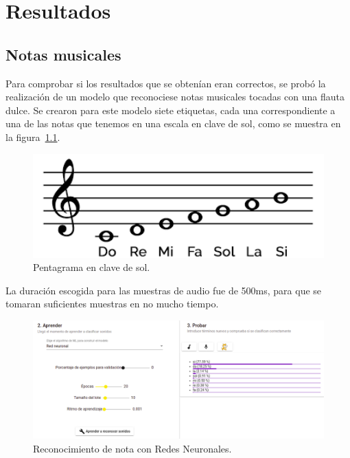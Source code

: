 \documentclass[a4paper, 12pt]{book}
\begin{document}

\cleardoublepage
\chapter{Resultados}
\label{chap:resultados}

\section{Notas musicales}
\label{sec:notas-musicales-res}

Para comprobar si los resultados que se obtenían eran correctos, se probó la realización de un modelo que reconociese notas musicales tocadas con una flauta dulce. Se crearon para este modelo siete etiquetas, cada una correspondiente a una de las notas que tenemos en una escala en clave de sol, como se muestra en la figura~\ref{fig:pentagrama}.


\begin{figure}
	\centering
	\includegraphics[width=12cm,keepaspectratio]{img/pentagrama.png}
	\caption{Pentagrama en clave de sol.}\label{fig:pentagrama}
\end{figure}

La duración escogida para las muestras de audio fue de 500ms, para que se tomaran suficientes muestras en no mucho tiempo.

\begin{figure}
	\centering
	\includegraphics[width=12cm]{img/nn1.png}
	\caption{Reconocimiento de nota con Redes Neuronales.}\label{fig:neural-networks}
\end{figure}
\end{document}
